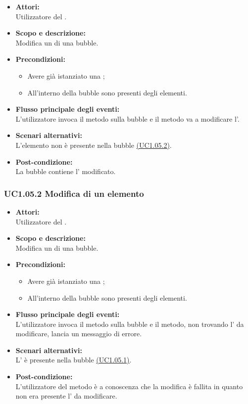 \begin{itemize}
	\item \textbf{Attori:}
	\\Utilizzatore del .
	\item \textbf{Scopo e descrizione:} 
	\\Modifica un  di una bubble.
	\item \textbf{Precondizioni:}
	\begin{itemize}
		\item Avere già istanziato una ;
		\item All'interno della bubble sono presenti degli elementi.
	\end{itemize}
	\item \textbf{Flusso principale degli eventi:}
	\\L’utilizzatore invoca il metodo sulla bubble e il metodo va a modificare l’.
	\item \textbf{Scenari alternativi:}
	\\ L’elemento non è presente nella bubble \hyperref[UC1.05.2]{(UC1.05.2)}.
	\item \textbf{Post-condizione:}
	\\La bubble contiene l’ modificato.
\end{itemize}

\subsubsection{UC1.05.2 Modifica di un elemento} \label{UC1.05.2}

\begin{itemize}
	\item \textbf{Attori:}
	\\Utilizzatore del .
	\item \textbf{Scopo e descrizione:} 
	\\Modifica un  di una bubble.
	\item \textbf{Precondizioni:}
	\begin{itemize}
		\item Avere già istanziato una ;
		\item All'interno della bubble sono presenti degli elementi.
	\end{itemize}
	\item \textbf{Flusso principale degli eventi:}
	\\L’utilizzatore invoca il metodo sulla bubble e il metodo, non trovando l’ da modificare, lancia un messaggio di errore.
	\item \textbf{Scenari alternativi:}
	\\L’ è presente nella bubble \hyperref[UC1.05.1]{(UC1.05.1)}.
	\item \textbf{Post-condizione:}
	\\L’utilizzatore del metodo è a conoscenza che la modifica è fallita in quanto non era presente l’ da modificare.
\end{itemize}

